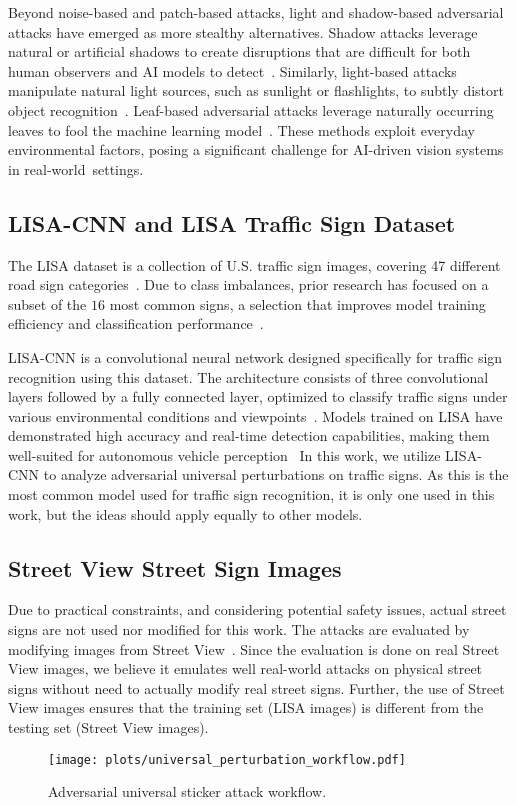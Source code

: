 Beyond noise-based and patch-based attacks, light and shadow-based adversarial attacks have emerged as more stealthy alternatives. Shadow attacks leverage natural or artificial shadows to create disruptions that are difficult for both human observers and AI models to detect~\cite{zhong2022shadows}. Similarly, light-based attacks manipulate natural light sources, such as sunlight or flashlights, to subtly distort object recognition~\cite{hsiao2024natural}. Leaf-based adversarial attacks leverage naturally occurring leaves to fool the machine learning model~\cite{etim2024fallleafadversarialattack}. These methods exploit everyday environmental factors, posing a significant challenge for AI-driven vision systems in real-world~settings.

\subsection{LISA-CNN and LISA Traffic Sign Dataset}

The LISA dataset is a collection of U.S. traffic sign images, covering 47 different road sign categories~\cite{lisa}. Due to class imbalances, prior research has focused on a subset of the $16$ most common signs, a selection that improves model training efficiency and classification performance~\cite{hsiao2024natural}.

LISA-CNN is a convolutional neural network designed specifically for traffic sign recognition using this dataset. The architecture consists of three convolutional layers followed by a fully connected layer, optimized to classify traffic signs under various environmental conditions and viewpoints~\cite{eykholt2018robust}. Models trained on LISA have demonstrated high accuracy and real-time detection capabilities, making them well-suited for autonomous vehicle perception~\cite{pavlitska2023adversarial} In this work, we utilize LISA-CNN to analyze adversarial universal perturbations on traffic signs. As this is the most common model used for traffic sign recognition, it is only one used in this work, but the ideas should apply equally to other models.

\subsection{Street View Street Sign Images}

Due to practical constraints, and considering potential safety issues, actual street signs are not used nor modified for this work. The attacks are evaluated by modifying images from Street View~\cite{googleExploreStreet}. Since the evaluation is done on real Street View images, we believe it emulates well real-world attacks on physical street signs without need to actually modify real street signs. Further, the use of Street View images ensures that the training set (LISA images) is different from the testing set (Street View images).

\begin{figure*}[t]
    \centering
    \texttt{[image: plots/universal\_perturbation\_workflow.pdf]}
    \caption{\small Adversarial universal sticker attack workflow.}
\label{fig_universal_perturbation_workflow}
\end{figure*}
